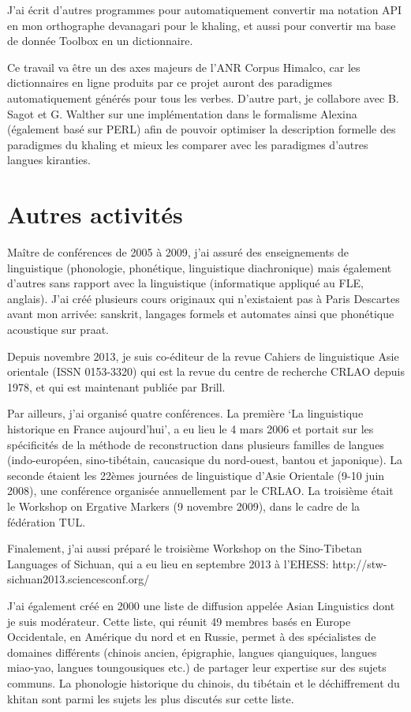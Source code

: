 \documentclass[oldfontcommands,oneside,a4paper,11pt]{memoir}
\begin{document}
J'ai écrit d'autres programmes pour automatiquement convertir   ma notation API en mon orthographe devanagari pour le khaling, et aussi pour convertir ma base de donnée Toolbox en un dictionnaire.

Ce travail va être un des axes majeurs de l'ANR Corpus Himalco, car les dictionnaires en ligne produits par ce projet auront des paradigmes automatiquement générés pour tous les verbes. D'autre part, je collabore avec B. Sagot et G. Walther sur une implémentation dans le formalisme Alexina (également basé sur PERL) afin de pouvoir optimiser la description formelle des paradigmes du khaling et mieux les comparer avec les paradigmes d'autres langues kiranties.


\chapter{Autres activités}


 Maître de conférences de 2005 à 2009, j’ai assuré  des enseignements de linguistique (phonologie, phonétique, linguistique diachronique) mais également d’autres sans rapport avec la linguistique (informatique appliqué au FLE, anglais). J’ai créé plusieurs cours originaux qui n’existaient pas à Paris Descartes avant mon arrivée: sanskrit, langages formels et automates ainsi que phonétique acoustique sur praat.
 
 Depuis novembre 2013, je suis co-éditeur de la revue Cahiers de linguistique Asie orientale (ISSN 0153-3320) qui est la revue du centre de recherche CRLAO depuis 1978, et qui est maintenant publiée par Brill.

Par ailleurs, j’ai organisé quatre conférences. La première ‘La linguistique historique en France aujourd’hui’, a eu lieu le 4 mars 2006 et portait sur les spécificités de la méthode de reconstruction dans plusieurs familles de langues (indo-européen, sino-tibétain, caucasique du nord-ouest, bantou et japonique). La seconde étaient les 22èmes journées de linguistique d’Asie Orientale (9-10 juin 2008), une conférence organisée annuellement par le CRLAO. La troisième était le Workshop on Ergative Markers (9 novembre 2009), dans le cadre de la fédération TUL.

Finalement, j'ai aussi préparé  le troisième Workshop on the Sino-Tibetan Languages of Sichuan, qui a eu lieu en septembre 2013 à l'EHESS: http://stw-sichuan2013.sciencesconf.org/

 

J’ai également créé en 2000 une liste de diffusion appelée Asian Linguistics dont je suis modérateur. Cette liste, qui réunit 49 membres basés en Europe Occidentale, en Amérique du nord et en Russie, permet à des spécialistes de domaines différents (chinois ancien, épigraphie, langues qianguiques, langues miao-yao, langues toungousiques etc.) de partager leur expertise sur des sujets communs. La phonologie historique du chinois, du tibétain et le déchiffrement du khitan sont parmi les sujets les plus discutés sur cette liste.
\end{document}

